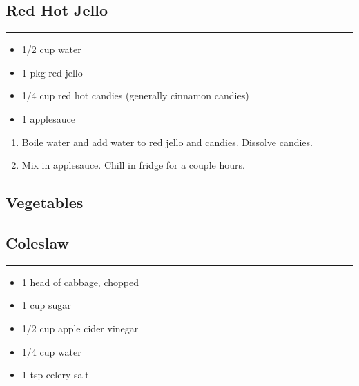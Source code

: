 \documentclass{article}
\begin{document}
\subsection{Red Hot Jello} 
\noindent\rule[0.5ex]{\linewidth}{1pt}

\begin{framed}
    \begin{itemize}
        \item 1/2 cup water
        \item 1 pkg red jello 
        \item 1/4 cup red hot candies (generally cinnamon candies)
        \item 1 applesauce
    \end{itemize}
\end{framed}

\begin{enumerate}
    \item 
        Boile water and add water to red jello and candies. Dissolve candies.
    \item 
        Mix in applesauce. Chill in fridge for a couple hours.
\end{enumerate}
\newpage

\vspace*{\fill}
\begin{center}
    \section{Vegetables}
\end{center}
\vspace*{\fill}
\newpage

\subsection{Coleslaw} 
\noindent\rule[0.5ex]{\linewidth}{1pt}

\begin{framed}
\begin{itemize}
    \item 1 head of cabbage, chopped
    \item 1 cup sugar
    \item 1/2 cup apple cider vinegar
    \item 1/4 cup water
    \item 1 tsp celery salt
\end{itemize}
\end{framed}
\end{document}
